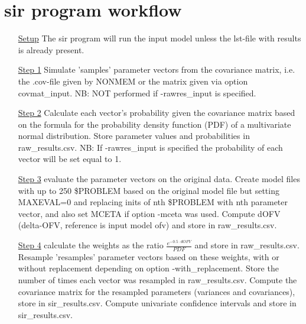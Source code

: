 \section{sir program workflow}
\begin{itemize}
\item[\underline{Setup}] The sir program will run the input model unless the lst-file with results is already present.
\item[\underline{Step 1}] Simulate 'samples' parameter vectors from the covariance matrix, i.e. the .cov-file given by NONMEM or the matrix given via option covmat\_input. 
NB: NOT performed if -rawres\_input is specified.
\item[\underline{Step 2}] Calculate each vector’s probability given the covariance matrix based on the formula for the probability 
density function (PDF) of a multivariate normal distribution. Store parameter values and probabilities in raw\_results.csv.
NB: If -rawres\_input is specified the probability of each vector will be set equal to 1.
\item[\underline{Step 3}] evaluate the parameter vectors on the original data.
Create model files with up to 250 \$PROBLEM based on the original model file but setting MAXEVAL=0
and replacing inits of nth \$PROBLEM with nth parameter vector, and also set MCETA if option -mceta was used. Compute dOFV 
(delta-OFV, reference is input model ofv) and store in raw\_results.csv.
\item[\underline{Step 4}] calculate the weights as the ratio $\frac{e^{-0.5\cdot dOFV}}{PDF}$ and store in raw\_results.csv. 
Resample 'resamples' parameter vectors based on these weights, with or without replacement depending on option -with\_replacement. 
Store the number of times each vector was resampled in raw\_results.csv.
Compute the covariance matrix for the resampled parameters (variances and covariances), 
store in sir\_results.csv. 
Compute univariate confidence intervals and store in sir\_results.csv.
\end{itemize}


